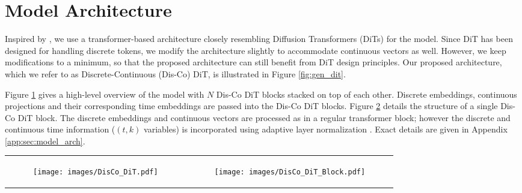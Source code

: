 \section{Model Architecture}
Inspired by \cite{peebles2023scalable}, we use a transformer-based architecture closely resembling Diffusion Transformers (DiTs) for the model. Since DiT has been designed for handling discrete tokens, we modify the architecture slightly to accommodate continuous vectors as well. However, we keep modifications to a minimum, so that the proposed architecture can still benefit from DiT design principles. Our proposed architecture, which we refer to as Discrete-Continuous (Dis-Co) DiT, is illustrated in Figure \ref{fig:gen_dit}.

Figure \ref{fig:disco_network} gives a high-level overview of the model with $N$ Dis-Co DiT blocks stacked on top of each other. Discrete embeddings, continuous projections and their corresponding time embeddings are passed into the Dis-Co DiT blocks. Figure \ref{fig:disco_block} details the structure of a single Dis-Co DiT block. The discrete embeddings and continuous vectors are processed as in a regular transformer block; however the discrete and continuous time information ($(t,k)$ variables) is incorporated using adaptive layer normalization \cite{xu2019adaptivelayernormalization}. Exact details are given in Appendix \ref{app:sec:model_arch}. 
\sloppy
\begin{figure*}
    \begin{tabular}[c]{lr}
    \begin{subfigure}[c]{0.45\textwidth}
      \texttt{[image: images/DisCo\_DiT.pdf]}
      \caption{}
      \label{fig:disco_network}
    \end{subfigure}&
    \begin{subfigure}[c]{0.45\textwidth}
      \texttt{[image: images/DisCo\_DiT\_Block.pdf]}
      \caption{}
      \label{fig:disco_block}
    \end{subfigure}
  \end{tabular} 
  \caption{\textbf{Dis-Co DiT Architecture:} (a) illustrates overall architecture, with both discrete and continuous inputs and outputs (b) shows detailed architecture of a single block, where time information is incorporated through adaptive layer normalization.}
  \label{fig:gen_dit}
\end{figure*}